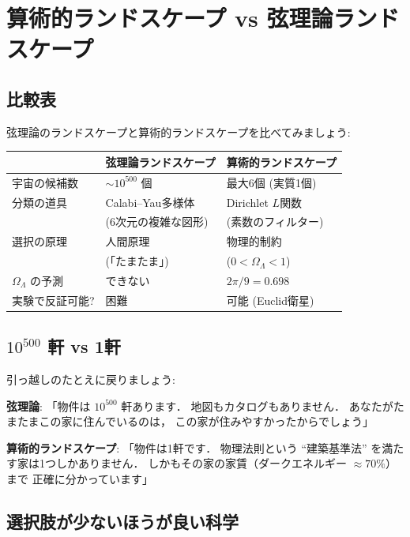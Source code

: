 \documentclass[11pt,a4paper]{article}
\begin{document}
\section{算術的ランドスケープ vs 弦理論ランドスケープ}

\subsection{比較表}

弦理論のランドスケープと算術的ランドスケープを比べてみましょう:

\begin{center}
\begin{tabular}{lll}
\toprule
& \textbf{弦理論ランドスケープ} & \textbf{算術的ランドスケープ} \\
\midrule
宇宙の候補数 & $\sim 10^{500}$ 個 & 最大6個 (実質1個) \\
分類の道具 & Calabi--Yau多様体 & Dirichlet $L$関数 \\
& (6次元の複雑な図形) & (素数のフィルター) \\
選択の原理 & 人間原理 & 物理的制約 \\
& (「たまたま」) & ($0<\Omega_\Lambda<1$) \\
$\Omega_\Lambda$ の予測 & できない & $2\pi/9 = 0.698$ \\
実験で反証可能? & 困難 & 可能 (Euclid衛星) \\
\bottomrule
\end{tabular}
\end{center}

\subsection{$10^{500}$ 軒 vs 1軒}

引っ越しのたとえに戻りましょう:

\begin{tcolorbox}[colback=yellow!5,colframe=yellow!50!black,title=家のたとえ]
\textbf{弦理論}: 「物件は $10^{500}$ 軒あります．
地図もカタログもありません．
あなたがたまたまこの家に住んでいるのは，
この家が住みやすかったからでしょう」

\textbf{算術的ランドスケープ}: 「物件は1軒です．
物理法則という ``建築基準法'' を満たす家は1つしかありません．
しかもその家の家賃（ダークエネルギー $\approx 70\%$）まで
正確に分かっています」
\end{tcolorbox}

\subsection{選択肢が少ないほうが良い科学}
\end{document}
